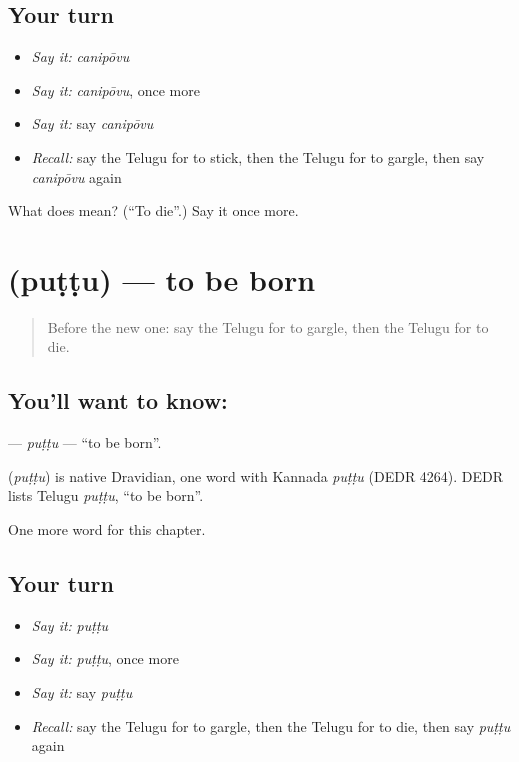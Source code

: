 \subsection*{Your turn}
\begin{itemize}
\raggedright
  \item \emph{Say it:} \emph{canipōvu}
  \item \emph{Say it:} \emph{canipōvu}, once more
  \item \emph{Say it:} say \emph{canipōvu}
  \item \emph{Recall:} say the Telugu for to stick, then the Telugu for to gargle, then say \emph{canipōvu} again
\end{itemize}

\begin{tcolorbox}[breakable,colback=teal!4,colframe=teal!35!black,title={Before you move on}]
What does  mean? (\textquotedblleft{}To die\textquotedblright{}.) Say it once more.
\end{tcolorbox}
\section[\texorpdfstring{\te{పుట్టు} (puṭṭu)}{పుట్టు (puṭṭu)}]{ (puṭṭu) — to be born}

\label{lesson:TE-C208-puttu}



\begin{quote}
Before the new one: say the Telugu for to gargle, then the Telugu for to die.
\end{quote}

\subsection*{You'll want to know: }
\textbf{} — \emph{puṭṭu} — \textquotedblleft{}to be born\textquotedblright{}.

\begin{cousinweb}
\textbf{} (\emph{puṭṭu}) is native Dravidian, one word with Kannada \emph{puṭṭu} (DEDR 4264). DEDR lists Telugu \emph{puṭṭu}, \textquotedblleft{}to be born\textquotedblright{}.
\end{cousinweb}

\begin{grammarlens}[title={What you've built}]
One more word for this chapter.
\end{grammarlens}

\subsection*{Your turn}
\begin{itemize}
\raggedright
  \item \emph{Say it:} \emph{puṭṭu}
  \item \emph{Say it:} \emph{puṭṭu}, once more
  \item \emph{Say it:} say \emph{puṭṭu}
  \item \emph{Recall:} say the Telugu for to gargle, then the Telugu for to die, then say \emph{puṭṭu} again
\end{itemize}

